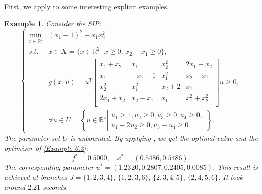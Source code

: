 \documentclass{amsart}
\theoremstyle{plain}
\newtheorem{exmp}[theorem]{Example}
\newcommand{\re}{\mathbb{R}}
\newcommand{\st}{\mathit{s.t.}}
\numberwithin{equation}{section}
\begin{document}
		First, we apply  to some interesting explicit examples. 
			\begin{exmp}\label{Example 6.3}
				Consider the SIP:
				\begin{equation*}
					\left\{
					\begin{array}{cl}
						\min\limits_{x\in\re^2} & (x_1+1)^2+x_1x^2_2 \\
						\st & x\in X=\{x\in\mathbb{R}^2\,\vert\, x\ge0,\, x_2-x_1\ge 0\},\\[5pt]
						&  g(x,u)= u^T\begin{bmatrix}
							x_1+x_2&x_1&x_2^2&2x_1+x_2\\
							x_1&-x_1+1&x_1^2&x_2-x_1\\
							x_2^2&x_1^2&x_2+2&x_1\\
							2x_1+x_2&x_2-x_1&x_1&x_1^2+x_2^2\\
						\end{bmatrix}u\geq  0,\\ [5pt]
						& \forall u\in U = \left\{ u\in\mathbb{R}^4\left\vert
						\begin{array}{c} 
						u_1\geq 1, u_2\ge 0, u_3\ge 0, u_4\ge 0,\\ 
						u_1-2u_2\geq 0, u_3-u_4\geq 0 
						\end{array}\right.\right\}.
					\end{array}
					\right.
				\end{equation*}
			The parameter set $U$ is unbounded. 
			By applying , we get the optimal value and the optimizer of  \eqref{Example 6.3}:
			\[ f^* = 0.5000,\quad x^* = (0.5486,0.5486). \]
			The corresponding parameter $u^* = (1.2320, 0.2807, 0.2405, 0.0085)$.
			This result is achieved at branches 
			$J = \{1,2,3,4\},\, \{1,2,3,6\},\, \{2,3,4,5\},\,\{2,4,5,6\}$.
			It took around $2.21$ seconds.
			\end{exmp}	
		
\end{document}
